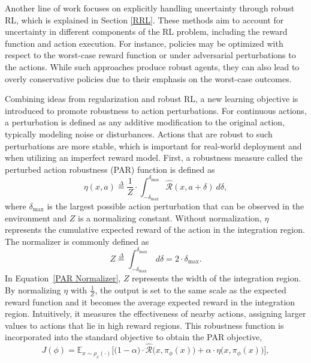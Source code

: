 \documentclass[./dissertation.tex]{subfiles}
\begin{document}
Another line of work focuses on explicitly handling uncertainty through robust RL, which is explained in Section \ref{RRL}. These methods aim to account for uncertainty in different components of the RL problem, including the reward function and action execution. For instance, policies may be optimized with respect to the worst-case reward function or under adversarial perturbations to the actions. While such approaches produce robust agents, they can also lead to overly conservative policies due to their emphasis on the worst-case outcomes.

Combining ideas from regularization and robust RL, a new learning objective is introduced to promote robustness to action perturbations. For continuous actions, a perturbation is defined as any additive modification to the original action, typically modeling noise or disturbances. Actions that are robust to such perturbations are more stable, which is important for real-world deployment and when utilizing an imperfect reward model. First, a robustness measure  called the perturbed action robustness (PAR) function is defined as
\begin{equation}
\label{PAR Function 2}
\eta(x,a) \overset{\Delta}{=}
\frac{1}{Z} \cdot \int_{-\delta_\text{max}}^{\delta_\text{max}}
\hat{\mathcal{R}}(x,a+\delta) \ d\delta,
\end{equation}
where $\delta_\text{max}$ is the largest possible action perturbation that can be observed in the environment and $Z$ is a normalizing constant. Without normalization, $\eta$ represents the cumulative expected reward of the action in the integration region. The normalizer is commonly defined as 
\begin{equation}
\label{PAR Normalizer}
Z \overset{\Delta}{=}
\int_{-\delta_\text{max}}^{\delta_\text{max}}
\ d\delta =
2\cdot \delta_\text{max}.
\end{equation}
In Equation~\ref{PAR Normalizer}, $Z$ represents the width of the integration region. By normalizing $\eta$ with $\frac{1}{Z}$, the output is set to the same scale as the expected reward function and it becomes the average expected reward in the integration region. Intuitively, it measures the effectiveness of nearby actions, assigning larger values to actions that lie in high reward regions. This robustness function is incorporated into the standard objective to obtain the PAR objective,
\begin{equation}
\label{New Objective}
J(\phi) =
\mathbb{E}_{x \sim \rho_x(\cdot)}
\Big[\big(1-\alpha\big) \cdot \hat{\mathcal{R}}\big(x,\pi_\phi(x)\big) + \alpha \cdot\eta\big(x, \pi_\phi(x)\big)\Big],
\end{equation}
\end{document}
